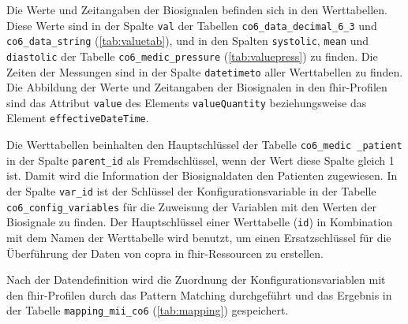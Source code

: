 Die Werte und Zeitangaben der Biosignalen befinden sich in den Werttabellen. Diese Werte sind in der Spalte \texttt{val} der Tabellen \texttt{co6\_data\_decimal\_6\_3} und \texttt{co6\_data\_string} (\ref{tab:valuetab}), und in den Spalten \texttt{systolic}, \texttt{mean} und \texttt{diastolic} der Tabelle \texttt{co6\_medic\_pressure} (\ref{tab:valuepress}) zu finden. Die Zeiten der Messungen sind in der Spalte \texttt{datetimeto} aller Werttabellen zu finden. Die Abbildung der Werte und Zeitangaben der Biosignalen in den \ac{fhir}-Profilen sind das Attribut \texttt{value} des Elements \texttt{valueQuantity} beziehungsweise das Element \texttt{effectiveDateTime}.

 Die Werttabellen beinhalten den Hauptschlüssel der Tabelle \texttt{co6\_medic \_patient} in der Spalte \texttt{parent\_id} als Fremdschlüssel, wenn der Wert diese Spalte gleich 1 ist. Damit wird die Information der Biosignaldaten den Patienten zugewiesen. In der Spalte \texttt{var\_id} ist der Schlüssel der Konfigurationsvariable in der Tabelle \texttt{co6\_config\_variables} für die Zuweisung der Variablen mit den Werten der Biosignale zu finden. Der Hauptschlüssel einer Werttabelle (\texttt{id}) in Kombination mit dem Namen der Werttabelle wird benutzt, um einen Ersatzschlüssel für die Überführung der Daten von \ac{copra} in \ac{fhir}-Ressourcen zu erstellen.

Nach der Datendefinition wird die Zuordnung der Konfigurationsvariablen mit den \ac{fhir}-Profilen durch das Pattern Matching durchgeführt und das Ergebnis in der Tabelle \texttt{mapping\_mii\_co6} (\ref{tab:mapping}) gespeichert.

